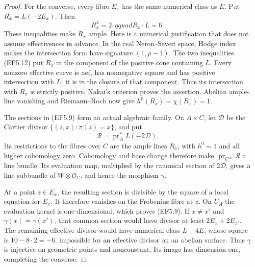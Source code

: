\begin{proof}
For the converse, every fibre \(E_x\) has the same numerical
class as \(E\). Put \(R_x=L(-2E_x)\). Then
\[
                     R_x^2=2,qquad R_x\cdot L=6.
 \tag{EF5.12}
\]
These inequalities make \(R_x\) ample. Here is a numerical
justification that does not assume effectiveness in advance.
In the real Neron--Severi space, Hodge index makes the intersection
form have signature \((1,\rho-1)\). The two inequalities
(EF5.12) put \(R_x\) in the component of the positive cone
containing \(L\). Every nonzero effective curve is nef, has
nonnegative square and has positive intersection with \(L\);
it is in the closure of that component. Thus its intersection
with \(R_x\) is strictly positive. Nakai's criterion proves
the assertion. Abelian ample-line vanishing and Riemann--Roch
now give \(h^0(R_x)=\chi(R_x)=1\).

The sections in (EF5.9) form an actual algebraic family. On
\(A\times C\), let \(\mathcal D\) be the Cartier divisor
\(\{(z,x):\pi(z)=x\}\), and put
\[
 \mathcal R=\operatorname{pr}_A^*L(-2\mathcal D).
\]
Its restrictions to the fibres over \(C\) are the ample lines
\(R_x\), with \(h^0=1\) and all higher cohomology zero.
Cohomology and base change therefore make
\(\operatorname{pr}_{C*}\mathcal R\) a line bundle.
Its evaluation map, multiplied by the canonical section of
\(2\mathcal D\), gives a line subbundle of
\(W\otimes\mathcal O_C\), and hence the morphism \(\gamma\).

At a point \(z\in E_x\), the resulting section is divisible
by the square of a local equation for \(E_x\). It therefore
vanishes on the Frobenius fibre at \(z\). On \(U_A\) the
evaluation kernel is one-dimensional, which proves (EF5.9).
If \(x\ne x'\) and \(\gamma(x)=\gamma(x')\), that common
section would have divisor at least \(2E_x+2E_{x'}\). The
remaining effective divisor would have numerical class
\(L-4E\), whose square is \(10-8\cdot2=-6\), impossible
for an effective divisor on an abelian surface. Thus \(\gamma\)
is injective on geometric points and nonconstant. Its image
has dimension one, completing the converse.
\end{proof}


